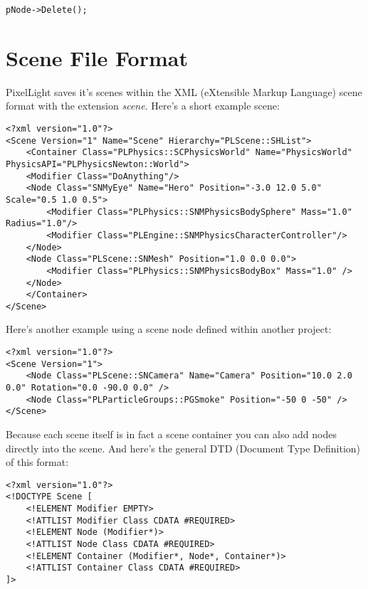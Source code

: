 \begin{lstlisting}[caption=Delete a scene node]
pNode->Delete();
\end{lstlisting}




\section{Scene File Format}
PixelLight saves it's scenes within the XML (eXtensible Markup Language) scene format with the extension \emph{scene}. Here's a short example scene:

\begin{lstlisting}[caption=Scene file example]
<?xml version="1.0"?>
<Scene Version="1" Name="Scene" Hierarchy="PLScene::SHList">
	<Container Class="PLPhysics::SCPhysicsWorld" Name="PhysicsWorld" PhysicsAPI="PLPhysicsNewton::World">
	<Modifier Class="DoAnything"/>
	<Node Class="SNMyEye" Name="Hero" Position="-3.0 12.0 5.0" Scale="0.5 1.0 0.5">
		<Modifier Class="PLPhysics::SNMPhysicsBodySphere" Mass="1.0" Radius="1.0"/>
		<Modifier Class="PLEngine::SNMPhysicsCharacterController"/>
	</Node>
	<Node Class="PLScene::SNMesh" Position="1.0 0.0 0.0">
		<Modifier Class="PLPhysics::SNMPhysicsBodyBox" Mass="1.0" />
	</Node>
	</Container>
</Scene>
\end{lstlisting}

Here's another example using a scene node defined within another project:

\begin{lstlisting}[caption=Another scene file example]
<?xml version="1.0"?>
<Scene Version="1">
	<Node Class="PLScene::SNCamera" Name="Camera" Position="10.0 2.0 0.0" Rotation="0.0 -90.0 0.0" />
	<Node Class="PLParticleGroups::PGSmoke" Position="-50 0 -50" />
</Scene>
\end{lstlisting}

Because each scene itself is in fact a scene container you can also add nodes directly into the scene. And here's the general DTD (Document Type Definition) of this format:

\begin{lstlisting}[caption=Scene file format DTD]
<?xml version="1.0"?>
<!DOCTYPE Scene [
	<!ELEMENT Modifier EMPTY>
	<!ATTLIST Modifier Class CDATA #REQUIRED>
	<!ELEMENT Node (Modifier*)>
	<!ATTLIST Node Class CDATA #REQUIRED>
	<!ELEMENT Container (Modifier*, Node*, Container*)>
	<!ATTLIST Container Class CDATA #REQUIRED>
]>
\end{lstlisting}

